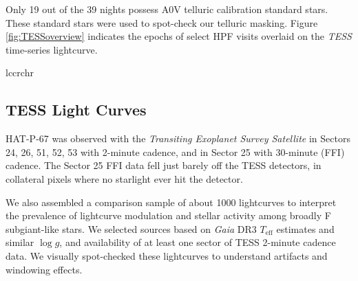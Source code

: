 \documentclass[linenumbers, twocolumn, trackchanges]{aastex631}
\begin{document}
Only 19 out of the 39 nights possess A0V telluric calibration standard stars.  These standard stars were used to spot-check our telluric masking.  Figure \ref{fig:TESSoverview} indicates the epochs of select HPF visits overlaid on the \emph{TESS} time-series lightcurve.


\begin{deluxetable}{lccrchr}
  \tablewidth{0pc}
  \tabletypesize{\scriptsize}
  \startdata
  
  \enddata
\end{deluxetable}

\subsection{TESS Light Curves}
HAT-P-67 was observed with the \emph{Transiting Exoplanet Survey Satellite} \citep[TESS,][]{2014SPIE.9143E..20R} in Sectors 24, 26, 51, 52, 53 with 2-minute cadence, and in Sector 25 with 30-minute (FFI) cadence.  The Sector 25 FFI data fell just barely off the TESS detectors, in collateral pixels where no starlight ever hit the detector.

We also assembled a comparison sample of about 1000 lightcurves to interpret the prevalence of lightcurve modulation and stellar activity among broadly F subgiant-like stars.  We selected sources based on \emph{Gaia} DR3 $T_\mathrm{eff}$ estimates and similar $\log{g}$,  and availability of at least one sector of TESS 2-minute cadence data.  We visually spot-checked these lightcurves to understand artifacts and windowing effects.
\end{document}
